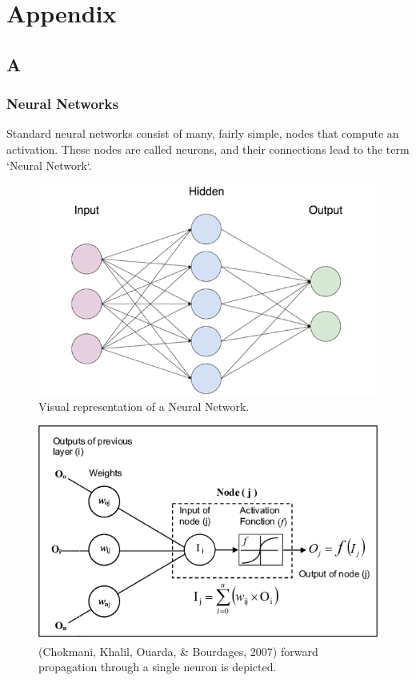 \section*{Appendix}

\subsection*{A}

\subsubsection*{Neural Networks}
Standard neural networks consist of many, fairly simple, nodes that compute an activation. These nodes are called neurons, and their connections lead to the term `Neural Network`. 

\begin{figure}[h]
	\includegraphics[width=\columnwidth]{fig8.png} 
	\caption{Visual representation of a Neural Network.}
\end{figure}

\begin{figure}[h]
	\includegraphics[width=\columnwidth]{fig9.png} 
	\caption{(Chokmani, Khalil, Ouarda, \& Bourdages, 2007) forward propagation through a single neuron is depicted.}
\end{figure}

